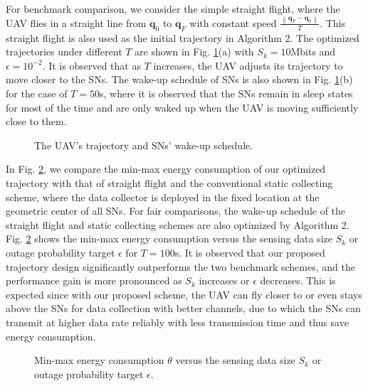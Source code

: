 \documentclass[journal]{IEEEtran}
\newcommand{\norm}[1]{\left\lVert#1\right\rVert}
\begin{document}
For benchmark comparison, we consider the simple straight flight, where the UAV flies in a straight line from $\mathbf{q}_0$ to $\mathbf{q}_F$ with constant speed $\frac{\norm{\mathbf{q}_F-\mathbf{q}_0}}{T}$. This straight flight is also used as the initial trajectory in Algorithm 2. The optimized trajectories under different $T$ are shown in Fig. \ref{fig:graph1}(a) with $S_k=10$Mbits and $\epsilon=10^{-2}$. It is observed that as $T$ increases, the UAV adjusts its trajectory to move closer to
the SNs. The wake-up schedule of SNs is also shown in Fig. \ref{fig:graph1}(b) for the case of $T=50$s, where it is observed that the SNs remain in sleep states for most of the time and are only waked up when the UAV is moving sufficiently close to them.\vspace{-0.18in}
\begin{figure}[ht]
\caption{The UAV's trajectory and SNs' wake-up schedule.}
\label{fig:graph1}\vspace{-0.12in}
\end{figure}

In Fig. \ref{fig:graph2}, we compare the min-max energy consumption of our optimized trajectory with that of straight flight and the conventional static collecting scheme, where the data collector is deployed in the fixed location at the geometric center of all SNs. For fair comparisons, the wake-up schedule of the straight flight and static collecting schemes are also optimized by Algorithm 2. Fig. \ref{fig:graph2} shows the min-max energy consumption versus the sensing data size $S_k$ or outage probability target $\epsilon$ for $T=100$s. It is observed that our proposed trajectory design significantly outperforms the two benchmark schemes, and the performance gain is more pronounced as $S_k$ increases or $\epsilon$ decreases. This is expected since with our proposed scheme, the UAV can fly closer to or
even stays above the SNs for data collection with better channels, due to which the SNs can transmit at higher data rate reliably with less transmission time and thus save energy consumption.
\begin{figure}
\caption{Min-max energy consumption $\theta$ versus the sensing data size $S_k$ or outage probability target $\epsilon$.}
\label{fig:graph2}\vspace{-0.22in}
\end{figure}
\end{document}
